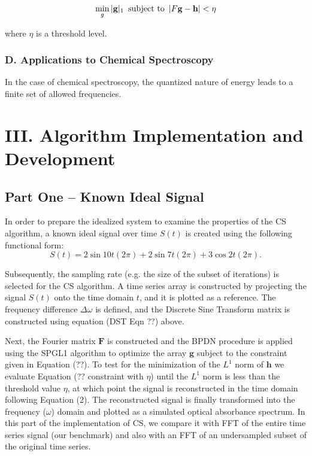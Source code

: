 \documentclass[11pt]{article}
\begin{document}
\begin{equation}
    \min_{g} |\mathbf{g}|_{1} \text{ \,subject to \,} |F \mathbf{g} - \mathbf{h}| < \eta
\end{equation}

where $\eta$ is a threshold level.
\subsubsection*{D.	Applications to Chemical Spectroscopy}	%

In the case of chemical spectroscopy, the quantized nature of energy leads to a finite set of allowed frequencies.


\section*{III.	Algorithm Implementation and Development}
\subsection*{Part One -- Known Ideal Signal}
In order to prepare the idealized system to examine the properties of the CS algorithm, a known ideal signal over time $S(t)$ is created using the following functional form:
\begin{equation}
	S(t) = 2\sin{10t(2\pi)}+2\sin{7t(2\pi)} + 3\cos{2t(2\pi)}.
\end{equation}
\par Subsequently, the sampling rate (e.g. the size of the subset of iterations) is selected for the CS algorithm. A time series array is constructed by projecting the signal $S(t)$ onto the time domain $t$, and it is plotted as a reference.  The frequency difference $\Delta\omega$ is defined, and the Discrete Sine Transform matrix is constructed using equation (DST Eqn ??) above.  

\par Next, the Fourier matrix $\mathbf{F}$ is constructed and the BPDN procedure is applied using the SPGL1 algorithm to optimize the array $\mathbf{g}$ subject to the constraint given in Equation (??). To test for the minimization of the $L^{1}$ norm of $\mathbf{h}$ we evaluate Equation (?? constraint with $\eta$) until the $L^{1}$ norm is less than the threshold value $\eta$, at which point the signal is reconstructed in the time domain following Equation (2).  The reconstructed signal is finally transformed into the frequency ($\omega$) domain and plotted as a simulated optical absorbance spectrum. In this part of the implementation of CS, we compare it with FFT of the entire time series signal (our benchmark) and also with an FFT of an undersampled subset of the original time series.  
\end{document}
